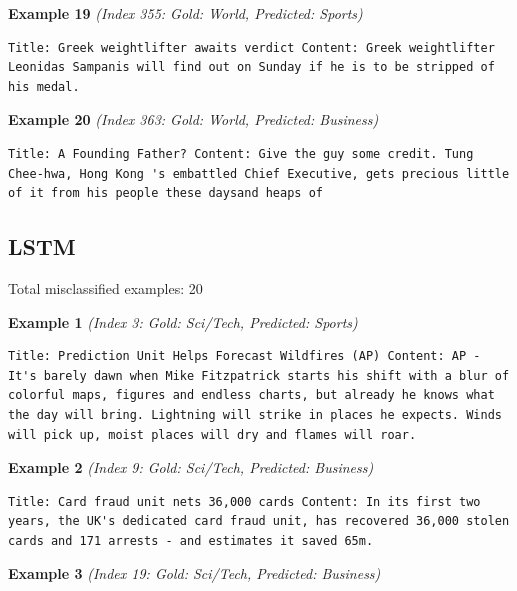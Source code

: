 \noindent
\textbf{Example 19} \quad \textit{(Index 355: Gold: World, Predicted: Sports)}

\begin{Verbatim}[breaklines=true,breakanywhere=true,fontsize=\small]
Title: Greek weightlifter awaits verdict Content: Greek weightlifter Leonidas Sampanis will find out on Sunday if he is to be stripped of his medal.
\end{Verbatim}

\noindent
\textbf{Example 20} \quad \textit{(Index 363: Gold: World, Predicted: Business)}

\begin{Verbatim}[breaklines=true,breakanywhere=true,fontsize=\small]
Title: A Founding Father? Content: Give the guy some credit. Tung Chee-hwa, Hong Kong 's embattled Chief Executive, gets precious little of it from his people these daysand heaps of
\end{Verbatim}

\subsection{LSTM}
\label{app:lstm}

Total misclassified examples: 20




\noindent
\textbf{Example 1} \quad \textit{(Index 3: Gold: Sci/Tech, Predicted: Sports)}

\begin{Verbatim}[breaklines=true,breakanywhere=true,fontsize=\small]
Title: Prediction Unit Helps Forecast Wildfires (AP) Content: AP - It's barely dawn when Mike Fitzpatrick starts his shift with a blur of colorful maps, figures and endless charts, but already he knows what the day will bring. Lightning will strike in places he expects. Winds will pick up, moist places will dry and flames will roar.
\end{Verbatim}

\noindent
\textbf{Example 2} \quad \textit{(Index 9: Gold: Sci/Tech, Predicted: Business)}

\begin{Verbatim}[breaklines=true,breakanywhere=true,fontsize=\small]
Title: Card fraud unit nets 36,000 cards Content: In its first two years, the UK's dedicated card fraud unit, has recovered 36,000 stolen cards and 171 arrests - and estimates it saved 65m.
\end{Verbatim}

\noindent
\textbf{Example 3} \quad \textit{(Index 19: Gold: Sci/Tech, Predicted: Business)}

